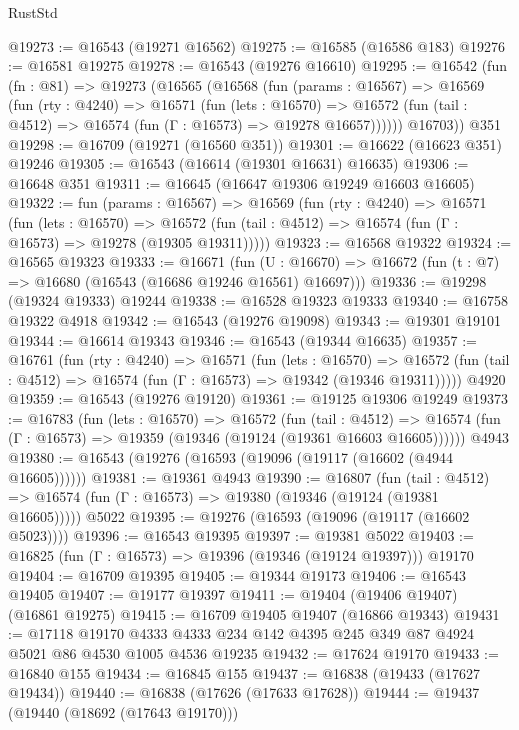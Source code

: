 \begin{lexlean}{RustStd}
\begin{coremodule}
@19273 := @16543 (@19271 @16562)
@19275 := @16585 (@16586 @183)
@19276 := @16581 @19275
@19278 := @16543 (@19276 @16610)
@19295 := @16542
    (fun (fn : @81) =>
    @19273
      (@16565
        (@16568
          (fun (params : @16567) =>
          @16569
            (fun (rty : @4240) =>
            @16571
              (fun (lets : @16570) =>
              @16572 (fun (tail : @4512) => @16574 (fun (Γ : @16573) => @19278 @16657))))))
        @16703))
    @351
@19298 := @16709 (@19271 (@16560 @351))
@19301 := @16622 (@16623 @351) @19246
@19305 := @16543 (@16614 (@19301 @16631) @16635)
@19306 := @16648 @351
@19311 := @16645 (@16647 @19306 @19249 @16603 @16605)
@19322 := fun (params : @16567) =>
  @16569
    (fun (rty : @4240) =>
    @16571
      (fun (lets : @16570) =>
      @16572 (fun (tail : @4512) => @16574 (fun (Γ : @16573) => @19278 (@19305 @19311)))))
@19323 := @16568 @19322
@19324 := @16565 @19323
@19333 := @16671
    (fun (U : @16670) => @16672 (fun (t : @7) => @16680 (@16543 (@16686 @19246 @16561) @16697)))
@19336 := @19298 (@19324 @19333) @19244
@19338 := @16528 @19323 @19333
@19340 := @16758 @19322 @4918
@19342 := @16543 (@19276 @19098)
@19343 := @19301 @19101
@19344 := @16614 @19343
@19346 := @16543 (@19344 @16635)
@19357 := @16761
    (fun (rty : @4240) =>
    @16571
      (fun (lets : @16570) =>
      @16572 (fun (tail : @4512) => @16574 (fun (Γ : @16573) => @19342 (@19346 @19311)))))
    @4920
@19359 := @16543 (@19276 @19120)
@19361 := @19125 @19306 @19249
@19373 := @16783
    (fun (lets : @16570) =>
    @16572
      (fun (tail : @4512) =>
      @16574 (fun (Γ : @16573) => @19359 (@19346 (@19124 (@19361 @16603 @16605))))))
    @4943
@19380 := @16543 (@19276 (@16593 (@19096 (@19117 (@16602 (@4944 @16605))))))
@19381 := @19361 @4943
@19390 := @16807
    (fun (tail : @4512) => @16574 (fun (Γ : @16573) => @19380 (@19346 (@19124 (@19381 @16605)))))
    @5022
@19395 := @19276 (@16593 (@19096 (@19117 (@16602 @5023))))
@19396 := @16543 @19395
@19397 := @19381 @5022
@19403 := @16825 (fun (Γ : @16573) => @19396 (@19346 (@19124 @19397))) @19170
@19404 := @16709 @19395
@19405 := @19344 @19173
@19406 := @16543 @19405
@19407 := @19177 @19397
@19411 := @19404 (@19406 @19407) (@16861 @19275)
@19415 := @16709 @19405 @19407 (@16866 @19343)
@19431 := @17118
    @19170
    @4333
    @4333
    @234
    @142
    @4395
    @245
    @349
    @87
    @4924
    @5021
    @86
    @4530
    @1005
    @4536
    @19235
@19432 := @17624 @19170
@19433 := @16840 @155
@19434 := @16845 @155
@19437 := @16838 (@19433 (@17627 @19434))
@19440 := @16838 (@17626 (@17633 @17628))
@19444 := @19437 (@19440 (@18692 (@17643 @19170)))

\end{coremodule}
\end{lexlean}

